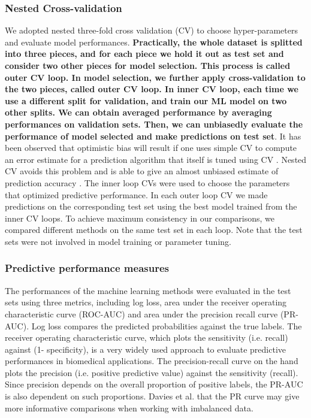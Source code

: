     \subsubsection{Nested Cross-validation}
      We adopted nested three-fold cross validation (CV) to choose hyper-parameters and evaluate model performances. \textbf{Practically, the whole dataset is splitted into three pieces, and for each piece we hold it out as test set and consider two other pieces for model selection. This process is called outer CV loop. In model selection, we further apply cross-validation to the two pieces, called outer CV loop. In inner CV loop, each time we use a different split for validation, and train our ML model on two other splits. We can obtain averaged performance by averaging performances on validation sets. Then, we can unbiasedly evaluate the performance of model selected and make predictions on test set}. It has been observed that optimistic bias will result if one uses simple CV to compute an error estimate for a prediction algorithm that itself is tuned using CV \cite{varma2006bias}. Nested CV avoids this problem and is able to give an almost unbiased estimate of prediction accuracy \cite{varma2006bias}. The inner loop CVs were used to choose the parameters that optimized predictive performance. In each outer loop CV we made predictions on the corresponding test set using the best model trained from the inner CV loops. To achieve maximum consistency in our comparisons, we compared different methods on the same test set in each loop. Note that the test sets were not involved in model training or parameter tuning.

    \subsubsection{Predictive performance measures}
      The performances of the machine learning methods were evaluated in the test sets using three metrics, including log loss, area under the receiver operating characteristic curve (ROC-AUC) and area under the precision recall curve (PR-AUC). Log loss compares the predicted probabilities against the true labels. The receiver operating characteristic curve, which plots the sensitivity (i.e. recall) against (1- specificity), is a very widely used approach to evaluate predictive performances in biomedical applications. The precision-recall curve on the hand plots the precision (i.e. positive predictive value) against the sensitivity (recall). Since precision depends on the overall proportion of positive labels, the PR-AUC is also dependent on such proportions. Davies et al. \cite{davis2006relationship}  that the PR curve may give more informative comparisons when working with imbalanced data.

